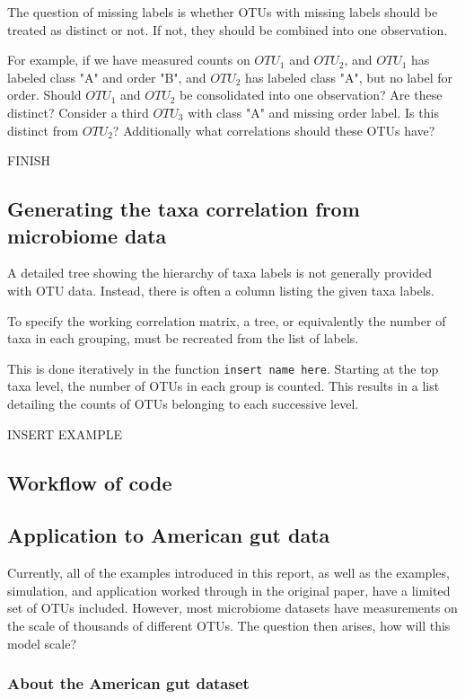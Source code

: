 \documentclass[12pt]{article}
\begin{document}
The question of missing labels is whether OTUs with missing labels should be treated as distinct or not. If not, they should be combined into one observation.

For example, if we have measured counts on $OTU_1$ and $OTU_2$, and $OTU_1$ has labeled class "A" and order "B", and $OTU_2$ has labeled class "A", but no label for order. Should $OTU_1$ and $OTU_2$ be consolidated into one observation? Are these distinct? Consider a third $OTU_3$ with class "A" and missing order label. Is this distinct from $OTU_2$? Additionally what correlations should these OTUs have?

FINISH



\subsection{Generating the taxa correlation from microbiome data}

A detailed tree showing the hierarchy of taxa labels is not generally provided with OTU data. Instead, there is often a column listing the given taxa labels.

To specify the working correlation matrix, a tree, or equivalently the number of taxa in each grouping, must be recreated from the list of labels.

This is done iteratively in the function \texttt{insert name here}. Starting at the top taxa level, the number of OTUs in each group is counted.
This results in a list detailing the counts of OTUs belonging to each successive level.

INSERT EXAMPLE

\subsection{Workflow of code }

\subsection{Application to American gut data}

Currently, all of the examples introduced in this report, as well as the examples, simulation, and application worked through in the original paper, have a limited set of OTUs included. However, most microbiome datasets have measurements on the scale of thousands of different OTUs. The question then arises, how will this model scale?

\subsubsection{About the American gut dataset}
\end{document}
